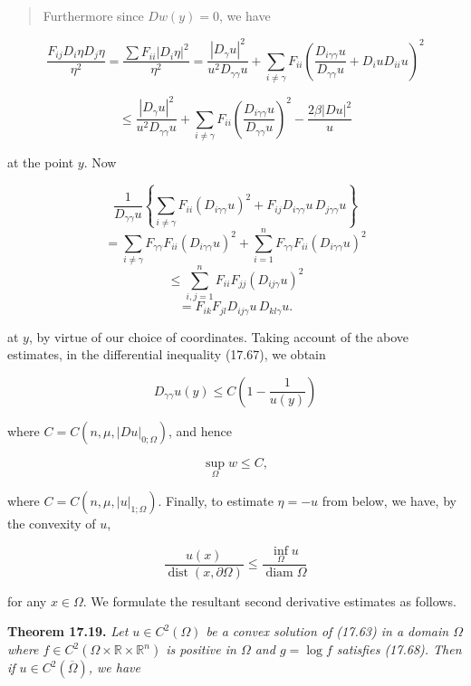 \begin{quote}
Furthermore since $Dw(y) = 0$, we have
\end{quote}

\[
\frac{F_{ij}D_i\eta D_j\eta}{\eta^2}
= \frac{\sum F_{ii}|D_i\eta|^2}{\eta^2}
= \frac{|D_\gamma u|^2}{u^2D_{\gamma\gamma}u} + \sum_{i\ne \gamma}F_{ii}\left(\frac{D_{i\gamma\gamma}u}{D_{\gamma\gamma}u} + D_i u D_{ii}u\right)^2
\]

\[
\le \frac{|D_\gamma u|^2}{u^2D_{\gamma\gamma}u} + \sum_{i\ne \gamma}F_{ii}\left(\frac{D_{i\gamma\gamma}u}{D_{\gamma\gamma}u}\right)^2 - \frac{2\beta|Du|^2}{u}
\]

\providecommand{\dist}{\operatorname{dist}}
\providecommand{\diam}{\operatorname{diam}}

at the point $y$. Now

\[
\frac{1}{D_{\gamma\gamma}u}
\left\{
\sum_{i\neq\gamma} F_{ii}(D_{i\gamma\gamma}u)^2
+
F_{ij}D_{i\gamma\gamma}u\,D_{j\gamma\gamma}u
\right\}
\]
\[
= \sum_{i\neq\gamma} F_{\gamma\gamma}F_{ii}(D_{i\gamma\gamma}u)^2
+\sum_{i=1}^n F_{\gamma\gamma}F_{ii}(D_{i\gamma\gamma}u)^2
\]
\[
\le \sum_{i,j=1}^n F_{ii}F_{jj}(D_{ij\gamma}u)^2
\]
\[
= F_{ik}F_{jl}D_{ij\gamma}u\,D_{kl\gamma}u.
\]

at $y$, by virtue of our choice of coordinates. Taking account of the above estimates,
in the differential inequality (17.67), we obtain

\[
D_{\gamma\gamma}u(y)\le C\left(1-\frac{1}{u(y)}\right)
\]

where $C=C(n,\mu,|Du|_{0;\Omega})$, and hence

\begin{equation}\tag{17.69}
\sup_{\Omega} w \le C,
\end{equation}

where $C=C(n,\mu,|u|_{1;\Omega})$. Finally, to estimate $\eta=-u$ from below, we have, by the
convexity of $u$,

\begin{equation}\tag{17.70}
\frac{u(x)}{\dist(x,\partial\Omega)}\le \frac{\inf_{\Omega} u}{\diam \Omega}
\end{equation}

for any $x\in\Omega$. We formulate the resultant second derivative estimates as follows.

\textbf{Theorem 17.19.} \emph{Let $u\in C^2(\Omega)$ be a convex solution of (17.63) in a domain $\Omega$ where
$f\in C^2(\Omega\times\mathbb{R}\times\mathbb{R}^n)$ is positive in $\Omega$ and $g=\log f$ satisfies (17.68). Then if $u\in C^2(\overline{\Omega})$,
we have}

